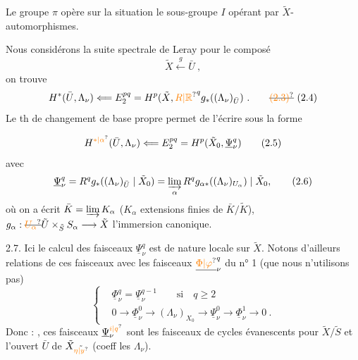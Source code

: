 
 Le groupe $\pi$ opère sur la situation
le sous-groupe $I$ opérant par $\tilde X$-automorphismes.

Nous considérons la suite spectrale de Leray pour le composé 
\[
\tilde X\xleftarrow{g}\bar U\ ,
\tag*{(2,3).}
\]
on trouve
\[
H^*(\bar U,\Lambda_\nu)\Longleftarrow E_2^{pq}=H^p(\tilde X,{\unsure{R|\mathbb R}}^qg_*((\Lambda_\nu)_{\bar U})\ .
\tag*{\deleted{\unsure{(2.3)}} (2.4)}
\]
Le th de changement de base propre permet de l'écrire sous la forme

\[
H^{\unsure{*|\alpha}}(\bar U,\Lambda_\nu)\Longleftarrow E_2^{pq}=H^p(\tilde X_0,\underline\Psi_\nu^q)
\tag*{(2.5)}
\]
avec
\[
\underline\Psi_\nu^q=R^qg_*((\Lambda_\nu)_{\bar U}\mid\tilde X_0)=\varinjlim_\alpha R^qg_{\alpha*}((\Lambda_\nu)_{U_\alpha})\mid\tilde X_0,
\tag*{(2.6)}
\]
où on a écrit $\bar K=\varinjlim K_\alpha$ ($K_\alpha$ extensions finies de $\bar K/\tilde K$), $g_\alpha:\deleted{\unsure{U_\alpha}}\tilde U\mathbin{\times}_{\tilde S}S_\alpha\longrightarrow\tilde X$  l'immersion canonique.

 2.7. Ici le calcul des faisceaux $\underline\Psi_\nu^q$ est de nature locale sur $\tilde X$. Notons d'ailleurs  relations de ces faisceaux avec  les faisceaux $\underline{\unsure{\Phi|\varphi}}_\nu^q$ du n° 1 (que nous n'utilisons pas)
\[
\left\{\begin{aligned}
&\underline\Phi_\nu^q=\underline\Psi_\nu^{q-1}\qquad\text{si}\quad q\geq2\\
&0\longrightarrow\underline\Phi_\nu^0\longrightarrow(\Lambda_\nu)_{X_0}\longrightarrow\underline\Psi_\nu^0\longrightarrow\underline\Phi_\nu^1\longrightarrow0\ .
\end{aligned}\right.
\tag*{(2.8)}
\]
Donc : , ces faisceaux $\underline\Psi_\nu^{\unsure{i|q}}$ sont les faisceaux de cycles évanescents pour $\tilde X/\tilde S$ et l'ouvert $\bar U$ de $\tilde X_{\tilde{\unsure{\eta|y}}}$ (coeff les $\Lambda_\nu$).

